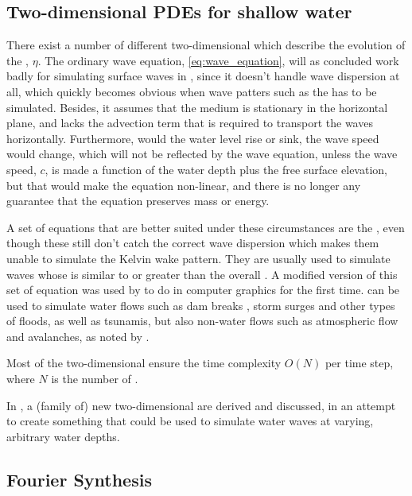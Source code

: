\subsection{Two-dimensional PDEs for shallow water}

There exist a number of different two-dimensional \PDEs which describe the evolution of the , $\eta$. The ordinary wave equation, \eqref{eq:wave_equation}, will as concluded work badly for simulating surface waves in , since it doesn't handle wave dispersion at all, which quickly becomes obvious when wave patters such as the  has to be simulated. Besides, it assumes that the medium is stationary in the horizontal plane, and lacks the advection term that is required to transport the waves horizontally. Furthermore, would the water level rise or sink, the wave speed would change, which will not be reflected by the wave equation, unless the wave speed, $c$, is made a function of the water depth plus the free surface elevation, but that would make the equation non-linear, and there is no longer any guarantee that the equation preserves mass or energy.

A set of equations that are better suited under these circumstances are the , even though these still don't catch the correct wave dispersion which makes them unable to simulate the Kelvin wake pattern. They are usually used to simulate waves whose \wavelength is similar to or greater than the overall  \citep{Thurey2006}. A modified version of this set of equation was used by \citet{Kass1990} to do \SWS in computer graphics for the first time. \SWS can be used to simulate water flows such as dam breaks \citep{Brodtkorb2010,Brodtkorba2012}, storm surges and other types of floods, as well as tsunamis, but also non-water flows such as atmospheric flow and avalanches, as noted by \citet{Brodtkorb2011}.

Most of the two-dimensional \PDEs ensure the time complexity $O(N)$ per time step, where $N$ is the number of .

In , a (family of) new two-dimensional \PDEs are derived and discussed, in an attempt to create something that could be used to simulate water waves at varying, arbitrary water depths.

\subsection{Fourier Synthesis}

